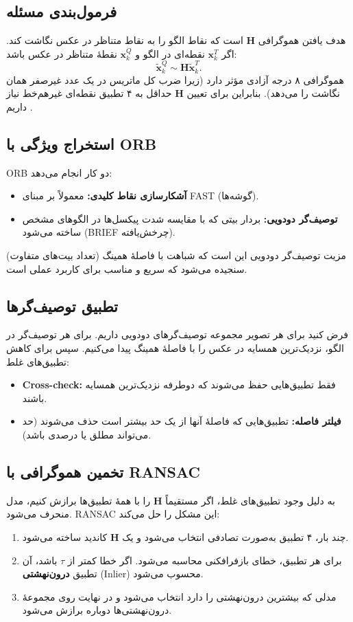 
\subsection{فرمول‌بندی مسئله}
هدف یافتن هموگرافی $\mathbf{H}$ است که نقاط الگو را به نقاط متناظر در عکس نگاشت کند. اگر $\mathbf{x}_k^T$ نقطه‌ای در الگو و $\mathbf{x}_k^Q$ نقطهٔ متناظر در عکس باشد:
\[
\tilde{\mathbf{x}}_k^Q \sim \mathbf{H}\tilde{\mathbf{x}}_k^T.
\]
هموگرافی ۸ درجه آزادی مؤثر دارد (زیرا ضرب کل ماتریس در یک عدد غیرصفر همان نگاشت را می‌دهد). بنابراین برای تعیین $\mathbf{H}$ حداقل به ۴ تطبیق نقطه‌ای غیرهم‌خط نیاز داریم \cite{HartleyZisserman2004}.

\subsection{استخراج ویژگی با ORB}
ORB \cite{Rublee2011ORB} دو کار انجام می‌دهد:
\begin{itemize}
  \item \textbf{آشکارسازی نقاط کلیدی:} معمولاً بر مبنای FAST (گوشه‌ها).
  \item \textbf{توصیف‌گر دودویی:} بردار بیتی که با مقایسه شدت پیکسل‌ها در الگوهای مشخص ساخته می‌شود (BRIEF چرخش‌یافته).
\end{itemize}
مزیت توصیف‌گر دودویی این است که شباهت با فاصلهٔ همینگ (تعداد بیت‌های متفاوت) سنجیده می‌شود که سریع و مناسب برای کاربرد عملی است.

\subsection{تطبیق توصیف‌گرها}
فرض کنید برای هر تصویر مجموعه توصیف‌گرهای دودویی داریم. برای هر توصیف‌گر در الگو، نزدیک‌ترین همسایه در عکس را با فاصلهٔ همینگ پیدا می‌کنیم. سپس برای کاهش تطبیق‌های غلط:
\begin{itemize}
  \item \textbf{Cross-check:} فقط تطبیق‌هایی حفظ می‌شوند که دوطرفه نزدیک‌ترین همسایه باشند.
  \item \textbf{فیلتر فاصله:} تطبیق‌هایی که فاصلهٔ آنها از یک حد بیشتر است حذف می‌شوند (حد می‌تواند مطلق یا درصدی باشد).
\end{itemize}

\subsection{تخمین هموگرافی با RANSAC}
به دلیل وجود تطبیق‌های غلط، اگر مستقیماً $\mathbf{H}$ را با همهٔ تطبیق‌ها برازش کنیم، مدل منحرف می‌شود. RANSAC \cite{FischlerBolles1981} این مشکل را حل می‌کند:
\begin{enumerate}
  \item چند بار، ۴ تطبیق به‌صورت تصادفی انتخاب می‌شود و یک $\mathbf{H}$ کاندید ساخته می‌شود.
  \item برای هر تطبیق، خطای بازفرافکنی محاسبه می‌شود. اگر خطا کمتر از $\tau$ باشد، آن تطبیق \textbf{درون‌نهشتی} (Inlier) محسوب می‌شود.
  \item مدلی که بیشترین درون‌نهشتی را دارد انتخاب می‌شود و در نهایت روی مجموعهٔ درون‌نهشتی‌ها دوباره برازش می‌شود.
\end{enumerate}

